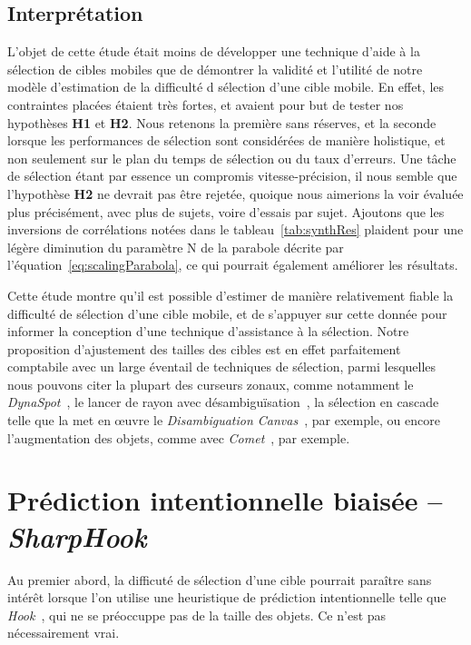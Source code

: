 	
	\subsection{Interprétation}
	L'objet de cette étude était moins de développer une technique d'aide à la sélection de cibles mobiles que de démontrer la validité et l'utilité de notre modèle d'estimation de la difficulté d sélection d'une cible mobile. En effet, les contraintes placées étaient très fortes, et avaient pour but de tester nos hypothèses \textbf{H1} et \textbf{H2}. Nous retenons la première sans réserves, et la seconde lorsque les performances de sélection sont considérées de manière holistique, et non seulement sur le plan du temps de sélection ou du taux d'erreurs. Une tâche de sélection étant par essence un compromis vitesse-précision, il nous semble que l'hypothèse \textbf{H2} ne devrait pas être rejetée, quoique nous aimerions la voir évaluée plus précisément, avec plus de sujets, voire d'essais par sujet. Ajoutons que les inversions de corrélations notées dans le tableau~\ref{tab:synthRes} plaident pour une légère diminution du paramètre N de la parabole décrite par l'équation~\ref{eq:scalingParabola}, ce qui pourrait également améliorer les résultats.
	
	Cette étude montre qu'il est possible d'estimer de manière relativement fiable la difficulté de sélection d'une cible mobile, et de s'appuyer sur cette donnée pour informer la conception d'une technique d'assistance à la sélection. Notre proposition d'ajustement des tailles des cibles est en effet parfaitement comptabile avec un large éventail de techniques de sélection, parmi lesquelles nous pouvons citer la plupart des curseurs zonaux, comme notamment le \emph{DynaSpot}~\cite{chapuis2009dynaspot}, le lancer de rayon avec désambiguïsation~\cite{grossman2006design}, la sélection en cascade telle que la met en \oe{}uvre le \emph{Disambiguation Canvas}~\cite{debarba2013disambiguation}, par exemple, ou encore l'augmentation des objets, comme avec \emph{Comet}~\cite{hasan2011comet}, par exemple.
	
	\section{Prédiction intentionnelle biaisée -- \emph{SharpHook}}
	Au premier abord, la difficuté de sélection d'une cible pourrait paraître sans intérêt lorsque l'on utilise une heuristique de prédiction intentionnelle telle que \emph{Hook}~\cite{ortega2013hook}, qui ne se préoccuppe pas de la taille des objets. Ce  n'est pas nécessairement vrai.
	

